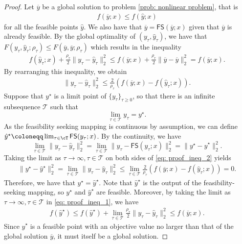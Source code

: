 \documentclass{article}
\def\FS{\mathsf{FS}}
\def\x{x}
\begin{document}
\begin{proof}
    Let $\overline{y}$ be a global solution to problem \eqref{prob: nonlinear problem}, that is
    \begin{align*}
        f(\overline{y}; x) \leq f(\hat{y};x)
    \end{align*}
    for all the feasible points $\hat{y}$. We also have that $\overline{y} = \FS(\overline{y}; x)$ given that $\overline{y}$ is already feasible.
    By the global optimality of $(y_\tau, \hat{y}_\tau)$, we have that $F(y_\tau, \hat{y}_\tau;\rho_\tau) \leq F(\overline{y}, \overline{y};\rho_\tau)$ which results in the inequality 
    \begin{align} \label{eq: proof_ineq_1}
        f(\hat{y}_\tau; x) + \frac{\rho_\tau}{2} \|y_\tau - \hat{y}_\tau \|^2_2 \leq f(\overline{y}; x) + \frac{\rho_\tau}{2} \|\overline{y} - \overline{y}\|^2_2 = f(\overline{y}; x).
    \end{align}
    By rearranging this inequality, we obtain 
    \begin{align} \label{eq: proof_ineq_2}
        \| y_\tau - \hat{y}_\tau\|^2_2 \leq \frac{2}{\rho_\tau}(f(\overline{y}; x) - f(\hat{y}_\tau; \x)).
    \end{align}
    Suppose that $y^\star$ is a limit point of $\{y_\tau\}_{\tau\geq 0}$, so that there is an infinite subsequence $\mathcal{T}$ such that 
    \[
    \lim_{\tau \in \mathcal{T}} y_\tau = y^\star.
    \]
    As the feasibility seeking mapping is continuous by assumption, we can define $\hat{y}^\star \coloneqq \lim_{\tau \in \cT} \mathsf{FS}(y_\tau;\x)$. By the continuity, we have 
    \[
    \lim_{\tau \in \mathcal{T}} \| y_\tau - \hat{y}_\tau\|^2_2 = \lim_{\tau \in \mathcal{T}} \| y_\tau - \FS(y_\tau; x)\|^2_2 = \| y^\star - \hat{y}^\star \|^2_2.
    \]  
    Taking the limit as $\tau \rightarrow \infty, \tau \in \mathcal{T}$ on both sides of \eqref{eq: proof_ineq_2} yields
    \begin{align*}
        \| y^\star - \hat{y}^\star\|^2_2 = \lim_{\tau \in \mathcal{T}} \| y_\tau - \hat{y}_\tau\|^2_2 \leq \lim_{\tau \in \mathcal{T}} \frac{2}{\rho_\tau}(f(\overline{y}; x) - f(\hat{y}_\tau; \x)) = 0.
    \end{align*}
    Therefore, we have that $y^\star = \hat{y}^\star$. Note that $\hat{y}^\star$ is the output of the feasibility-seeking mapping, so $y^\star$ and $ \hat{y}^\star$ are feasible. 
    Moreover, by taking the limit as $\tau \rightarrow \infty, \tau \in \mathcal{T}$ in \eqref{eq: proof_ineq_1}, we have 
    \begin{align*}
        f(\hat{y}^\star) \leq f(\hat{y}^\star) + \lim_{\tau \in \mathcal{T}} \frac{\rho_\tau}{2} \| y_\tau - \hat{y}_\tau \|^2_2 \leq f(\overline{y}; x).
    \end{align*}
    Since $\hat{y}^\star$ is a feasible point with an objective value no larger than that of the global solution $\overline{y}$, it must itself be a global solution.
\end{proof}
\end{document}
